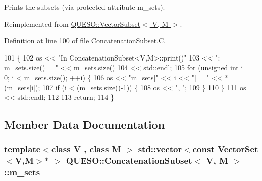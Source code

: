 Prints the subsets (via protected attribute m\-\_\-sets). 



Reimplemented from \hyperlink{class_q_u_e_s_o_1_1_vector_subset_a62ba8816790e495f7d2302afeaecb436}{Q\-U\-E\-S\-O\-::\-Vector\-Subset$<$ V, M $>$}.



Definition at line 100 of file Concatenation\-Subset.\-C.


\begin{DoxyCode}
101 \{
102   os << \textcolor{stringliteral}{"In ConcatenationSubset<V,M>::print()"}
103      << \textcolor{stringliteral}{": m\_sets.size() = "} << \hyperlink{class_q_u_e_s_o_1_1_concatenation_subset_ab318a754dbb4b2a8be6f5d94a6e4c2dd}{m\_sets}.size()
104      << std::endl;
105   \textcolor{keywordflow}{for} (\textcolor{keywordtype}{unsigned} \textcolor{keywordtype}{int} i = 0; i < \hyperlink{class_q_u_e_s_o_1_1_concatenation_subset_ab318a754dbb4b2a8be6f5d94a6e4c2dd}{m\_sets}.size(); ++i) \{
106     os << \textcolor{stringliteral}{"m\_sets["} << i << \textcolor{stringliteral}{"] = "} << *(\hyperlink{class_q_u_e_s_o_1_1_concatenation_subset_ab318a754dbb4b2a8be6f5d94a6e4c2dd}{m\_sets}[i]);
107     \textcolor{keywordflow}{if} (i < (\hyperlink{class_q_u_e_s_o_1_1_concatenation_subset_ab318a754dbb4b2a8be6f5d94a6e4c2dd}{m\_sets}.size()-1)) \{
108       os << \textcolor{stringliteral}{", "};
109     \}
110   \}
111   os << std::endl;
112 
113   \textcolor{keywordflow}{return};
114 \}
\end{DoxyCode}


\subsection{Member Data Documentation}
\hypertarget{class_q_u_e_s_o_1_1_concatenation_subset_ab318a754dbb4b2a8be6f5d94a6e4c2dd}{
\subsubsection[{m\-\_\-sets}]{\setlength{\rightskip}{0pt plus 5cm}template$<$class V , class M $>$ std\-::vector$<$const {\bf Vector\-Set}$<$V,M$>$$\ast$ $>$ {\bf Q\-U\-E\-S\-O\-::\-Concatenation\-Subset}$<$ V, M $>$\-::m\-\_\-sets\hspace{0.3cm}{\ttfamily [protected]}}}\label{class_q_u_e_s_o_1_1_concatenation_subset_ab318a754dbb4b2a8be6f5d94a6e4c2dd}


